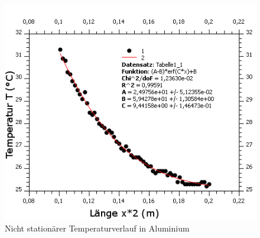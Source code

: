 \documentclass[12pt,a4paper]{article}
\begin{document}
\begin{figure}[H]
	\centering
	\includegraphics[scale=7]{./BilderCorrect/nicht_stationaer_temp_verlauf.png}
	\caption{Nicht stationärer Temperaturverlauf in Aluminium }
	\label{fig:nicht_stat_verlauf}
\end{figure}
\end{document}
